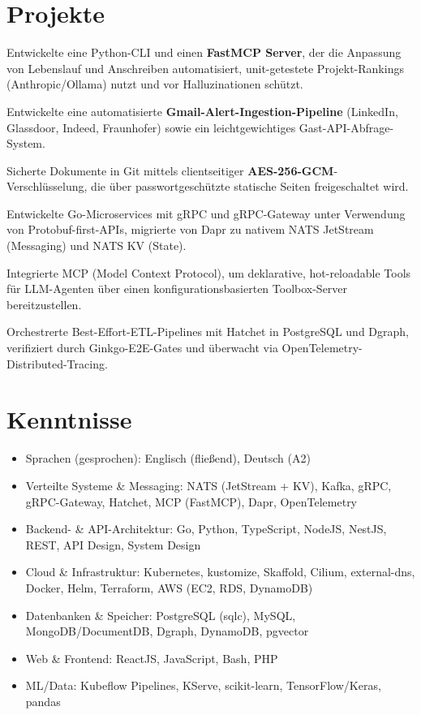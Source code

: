 \documentclass[10pt,a4paper]{resume}
\begin{document}
\section{Projekte}

\bullets
  \item Entwickelte eine Python-CLI und einen \textbf{FastMCP Server}, der die Anpassung von Lebenslauf und Anschreiben automatisiert, unit-getestete Projekt-Rankings (Anthropic/Ollama) nutzt und vor Halluzinationen schützt.
  \item Entwickelte eine automatisierte \textbf{Gmail-Alert-Ingestion-Pipeline} (LinkedIn, Glassdoor, Indeed, Fraunhofer) sowie ein leichtgewichtiges Gast-API-Abfrage-System.
  \item Sicherte Dokumente in Git mittels clientseitiger \textbf{AES-256-GCM}-Verschlüsselung, die über passwortgeschützte statische Seiten freigeschaltet wird.
\bulletsend
\vspace{1.0pt}
\bullets
  \item Entwickelte Go-Microservices mit gRPC und gRPC-Gateway unter Verwendung von Protobuf-first-APIs, migrierte von Dapr zu nativem NATS JetStream (Messaging) und NATS KV (State).
  \item Integrierte MCP (Model Context Protocol), um deklarative, hot-reloadable Tools für LLM-Agenten über einen konfigurationsbasierten Toolbox-Server bereitzustellen.
  \item Orchestrerte Best-Effort-ETL-Pipelines mit Hatchet in PostgreSQL und Dgraph, verifiziert durch Ginkgo-E2E-Gates und überwacht via OpenTelemetry-Distributed-Tracing.
\bulletsend

\section{Kenntnisse}

\begin{itemize}[leftmargin=1.4em,nosep,topsep=2pt]
  \item Sprachen (gesprochen): Englisch (fließend), Deutsch (A2)
  \item Verteilte Systeme \& Messaging: NATS (JetStream + KV), Kafka, gRPC, gRPC-Gateway, Hatchet, MCP (FastMCP), Dapr, OpenTelemetry
  \item Backend- \& API-Architektur: Go, Python, TypeScript, NodeJS, NestJS, REST, API Design, System Design
  \item Cloud \& Infrastruktur: Kubernetes, kustomize, Skaffold, Cilium, external-dns, Docker, Helm, Terraform, AWS (EC2, RDS, DynamoDB)
  \item Datenbanken \& Speicher: PostgreSQL (sqlc), MySQL, MongoDB/DocumentDB, Dgraph, DynamoDB, pgvector
  \item Web \& Frontend: ReactJS, JavaScript, Bash, PHP
  \item ML/Data: Kubeflow Pipelines, KServe, scikit-learn, TensorFlow/Keras, pandas
\end{itemize}
\end{document}
